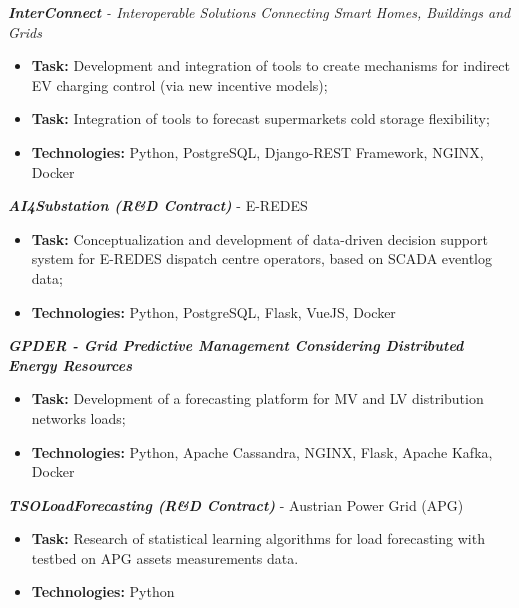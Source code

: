 \documentclass{mycv}
\begin{document}
\begin{myitemize}	

	\item \textit{\textbf{InterConnect} - Interoperable Solutions Connecting Smart Homes, Buildings and Grids}
	\begin{itemize}
		\item \textbf{Task:} Development and integration of tools to create mechanisms for indirect EV charging control (via new incentive models);
		\item \textbf{Task:} Integration of tools to forecast supermarkets cold storage flexibility;
		\item \textbf{Technologies:} Python, PostgreSQL, Django-REST Framework, NGINX, Docker
	\end{itemize}


\vspace{0.30cm}	
	\item \textit{\textbf{AI4Substation (R\&D Contract)}} - E-REDES
	\begin{itemize}
		\item \textbf{Task:} Conceptualization and development of data-driven decision support system for E-REDES dispatch centre operators, based on SCADA eventlog data;
		\item \textbf{Technologies:} Python, PostgreSQL, Flask, VueJS, Docker
	\end{itemize}

\newpage
	\vspace{0.15cm}	
	\item \textit{\textbf{GPDER - Grid Predictive Management Considering Distributed Energy Resources}}
	\begin{itemize}
		\item \textbf{Task:} Development of a forecasting platform for MV and LV distribution networks loads;
		\item \textbf{Technologies:} Python, Apache Cassandra, NGINX, Flask, Apache Kafka, Docker
	\end{itemize}

	\vspace{0.15cm}	
	\item \textit{\textbf{TSOLoadForecasting (R\&D Contract)}} - Austrian Power Grid (APG)
	\begin{itemize}
		\item \textbf{Task:} Research of statistical learning algorithms for load forecasting with  testbed on APG assets measurements data.
		\item \textbf{Technologies:} Python
	\end{itemize}
	

\end{myitemize}
\end{document}
